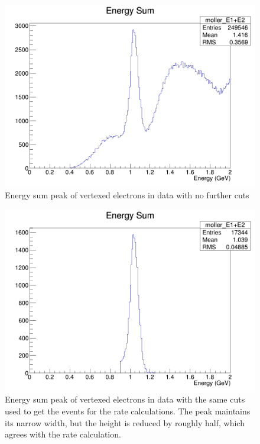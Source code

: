 \documentclass{article}
\begin{document}
\begin{figure}[H]
  	\includegraphics[width=\linewidth]{PostCollabMeet/Pass3Data/Full5772/RAW_moller_ESum.png}
  	\caption{Energy sum peak of vertexed electrons in data with no further cuts}
  	\label{fig:UncutNormData}
	\end{figure}

\begin{figure}[H]
  	\includegraphics[width=\linewidth]{PostCollabMeet/Pass3Data/Full5772/CUT_TestEE.png}
  	\caption{Energy sum peak of vertexed electrons in data with the same cuts used to get the events for the rate calculations. The peak maintains its narrow width, but the height is reduced by roughly half, which agrees with the rate calculation.}
  	\label{fig:CutNormData}
	\end{figure}
\end{document}
